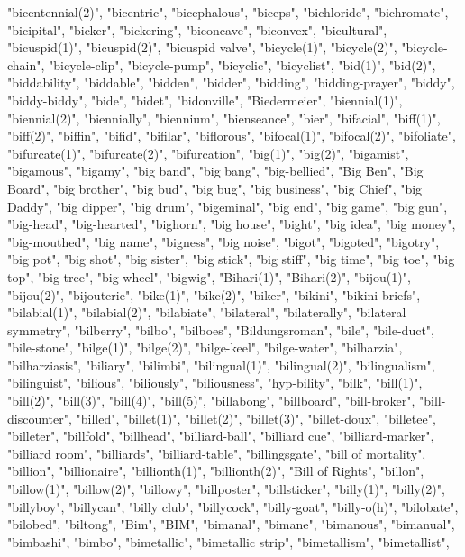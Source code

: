 "bicentennial(2)",
"bicentric",
"bicephalous",
"biceps",
"bichloride",
"bichromate",
"bicipital",
"bicker",
"bickering",
"biconcave",
"biconvex",
"bicultural",
"bicuspid(1)",
"bicuspid(2)",
"bicuspid valve",
"bicycle(1)",
"bicycle(2)",
"bicycle-chain",
"bicycle-clip",
"bicycle-pump",
"bicyclic",
"bicyclist",
"bid(1)",
"bid(2)",
"biddability",
"biddable",
"bidden",
"bidder",
"bidding",
"bidding-prayer",
"biddy",
"biddy-biddy",
"bide",
"bidet",
"bidonville",
"Biedermeier",
"biennial(1)",
"biennial(2)",
"biennially",
"biennium",
"bienseance",
"bier",
"bifacial",
"biff(1)",
"biff(2)",
"biffin",
"bifid",
"bifilar",
"biflorous",
"bifocal(1)",
"bifocal(2)",
"bifoliate",
"bifurcate(1)",
"bifurcate(2)",
"bifurcation",
"big(1)",
"big(2)",
"bigamist",
"bigamous",
"bigamy",
"big band",
"big bang",
"big-bellied",
"Big Ben",
"Big Board",
"big brother",
"big bud",
"big bug",
"big business",
"big Chief",
"big Daddy",
"big dipper",
"big drum",
"bigeminal",
"big end",
"big game",
"big gun",
"big-head",
"big-hearted",
"bighorn",
"big house",
"bight",
"big idea",
"big money",
"big-mouthed",
"big name",
"bigness",
"big noise",
"bigot",
"bigoted",
"bigotry",
"big pot",
"big shot",
"big sister",
"big stick",
"big stiff",
"big time",
"big toe",
"big top",
"big tree",
"big wheel",
"bigwig",
"Bihari(1)",
"Bihari(2)",
"bijou(1)",
"bijou(2)",
"bijouterie",
"bike(1)",
"bike(2)",
"biker",
"bikini",
"bikini briefs",
"bilabial(1)",
"bilabial(2)",
"bilabiate",
"bilateral",
"bilaterally",
"bilateral symmetry",
"bilberry",
"bilbo",
"bilboes",
"Bildungsroman",
"bile",
"bile-duct",
"bile-stone",
"bilge(1)",
"bilge(2)",
"bilge-keel",
"bilge-water",
"bilharzia",
"bilharziasis",
"biliary",
"bilimbi",
"bilingual(1)",
"bilingual(2)",
"bilingualism",
"bilinguist",
"bilious",
"biliously",
"biliousness",
"hyp-bility",
"bilk",
"bill(1)",
"bill(2)",
"bill(3)",
"bill(4)",
"bill(5)",
"billabong",
"billboard",
"bill-broker",
"bill-discounter",
"billed",
"billet(1)",
"billet(2)",
"billet(3)",
"billet-doux",
"billetee",
"billeter",
"billfold",
"billhead",
"billiard-ball",
"billiard cue",
"billiard-marker",
"billiard room",
"billiards",
"billiard-table",
"billingsgate",
"bill of mortality",
"billion",
"billionaire",
"billionth(1)",
"billionth(2)",
"Bill of Rights",
"billon",
"billow(1)",
"billow(2)",
"billowy",
"billposter",
"billsticker",
"billy(1)",
"billy(2)",
"billyboy",
"billycan",
"billy club",
"billycock",
"billy-goat",
"billy-o(h)",
"bilobate",
"bilobed",
"biltong",
"Bim",
"BIM",
"bimanal",
"bimane",
"bimanous",
"bimanual",
"bimbashi",
"bimbo",
"bimetallic",
"bimetallic strip",
"bimetallism",
"bimetallist",
